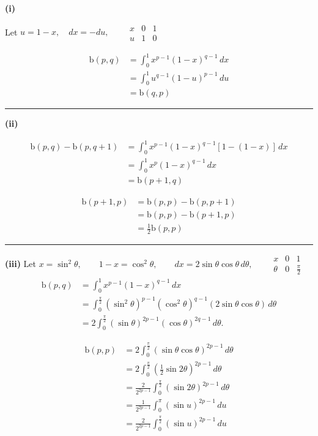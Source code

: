 \documentclass[12pt]{article}
\begin{document}
\newcommand{\ds}{\displaystyle}

\textbf{(i)}

Let $u=1-x, \quad dx=-du, \qquad
\begin{array}{c|cc}
x & 0 & 1\\
\hline
u & 1 & 0
\end{array}
$

\begin{align*}
\mathrm{b}(p,q)
&=\int_0^1x^{p-1}(1-x)^{q-1}\,dx\\
&=\int_0^1u^{q-1}(1-u)^{p-1}\,du\\
&=\mathrm{b}(q,p)
\end{align*}

\bigskip\hrule\bigskip

\textbf{(ii)}

\begin{align*}
\mathrm{b}(p,q)-\mathrm{b}(p,q+1)&=\int_0^1x^{p-1}(1-x)^{q-1}\left[1-(1-x)\right]\,dx\\
&=\int_0^1x^p(1-x)^{q-1}\,dx\\
&=\mathrm{b}(p+1,q)
\end{align*}

\begin{align*}
\mathrm{b}(p+1,p)&=\mathrm{b}(p,p)-\mathrm{b}(p,p+1)\\
&=\mathrm{b}(p,p)-\mathrm{b}(p+1,p)\\
&=\frac{1}{2}\mathrm{b}(p,p)
\end{align*}

\bigskip\hrule\bigskip

\textbf{(iii)}
Let $x=\sin^2\theta, \qquad 1-x=\cos^2\theta,\qquad dx=2\sin\theta\cos\theta\,d\theta,\qquad
\begin{array}{c|cc}
x & 0 & 1\\
\hline
\theta & 0 & \frac{\pi}{2}
\end{array}
$
\begin{align*}
\mathrm{b}(p,q)
&=\int_0^1x^{p-1}(1-x)^{q-1}\,dx\\
&=\int_0^{\frac{\pi}{2}}
(\sin^2\theta)^{p-1}(\cos^2\theta)^{q-1}
(2\sin\theta\cos\theta)\,d\theta\\
&=2\int_0^{\frac{\pi}{2}}
(\sin\theta)^{2p-1}(\cos\theta)^{2q-1}\,d\theta.
\end{align*}


\begin{align*}
\mathrm{b}(p,p)
&=2\int_0^{\frac{\pi}{2}}
(\sin\theta\cos\theta)^{2p-1}\,d\theta\\
&=2\int_0^{\frac{\pi}{2}}
\left(\frac12\sin2\theta\right)^{2p-1}\,d\theta\\
&=\frac{2}{2^{2p-1}}
\int_0^{\frac{\pi}{2}}(\sin2\theta)^{2p-1}\,d\theta\\
&=\frac{1}{2^{2p-1}}\int_0^\pi(\sin u)^{2p-1}\,du\\
&=\frac{2}{2^{2p-1}}
\int_0^{\frac{\pi}{2}}(\sin u)^{2p-1}\,du
\end{align*}
\end{document}
